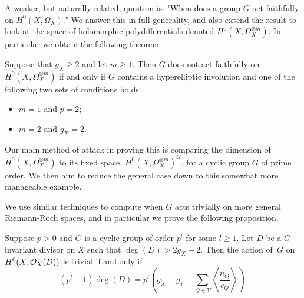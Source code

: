 A weaker, but naturally related, question is: "When does a group $G$ act faithfully on $H^0(X,\Omega_X)$."
We answer this in full generality, and also extend the result to look at the space of holomorphic polydifferentials denoted $H^0(X,\Omega_X^{\otimes m})$.
In particular we obtain the following theorem.
    \begin{thm}\label{theoremfaithfulaction}
    Suppose that $g_X\geq 2$ and let $m\geq1$. 
    Then $G$ does not act faithfully on $H^0(X,\Omega_X^{\otimes m})$ if and only if $G$ contains a hyperelliptic involution and one of the following two sets of conditions holds:
        \begin{itemize}
        \item $m=1$ and $p=2$;
        \item $m=2$ and $g_X=2$.
        \end{itemize}
    \end{thm}
Our main method of attack in proving this is comparing the dimension of $H^0(X,\Omega_X^{\otimes m})$ to its fixed space, $H^0(X,\Omega_X^{\otimes m})^G$, for a cyclic group $G$ of prime order.
We then aim to reduce the general case down to this somewhat more manageable example.

We use similar techniques to compute when $G$ acts trivially on more general Riemann-Roch spaces, and in particular we prove the following proposition.
    \begin{prop}\label{nakaj}
    Suppose $p>0$ and $G$ is a cyclic group of order $p^l$ for some $l\geq 1$.
    Let $D$ be a $G$-invariant divisor on $X$ such that $\deg(D)>2g_X-2$.
    Then the action of~$G$ on $H^0(X,{\cal O}_X(D))$ is trivial if and only if
        \[ 
        (p^l-1)\deg(D)=p^l\left(g_X-g_Y-\sum_{Q\in Y}\left\langle \frac{n_Q}{e_Q} \right\rangle\right).
        \]
    \end{prop}





